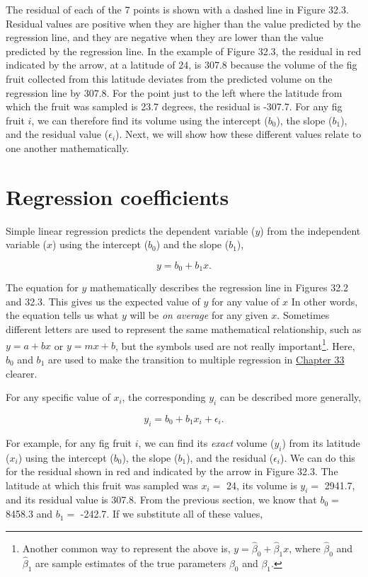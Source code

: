 \documentclass[
  openany]{scrbook}
\begin{document}
The residual of each of the 7 points is shown with a dashed line in Figure 32.3.
Residual values are positive when they are higher than the value predicted by the regression line, and they are negative when they are lower than the value predicted by the regression line.
In the example of Figure 32.3, the residual in red indicated by the arrow, at a latitude of 24, is 307.8 because the volume of the fig fruit collected from this latitude deviates from the predicted volume on the regression line by 307.8.
For the point just to the left where the latitude from which the fruit was sampled is 23.7 degrees, the residual is -307.7.
For any fig fruit \(i\), we can therefore find its volume using the intercept (\(b_{0}\)), the slope (\(b_{1}\)), and the residual value (\(\epsilon_{i}\)).
Next, we will show how these different values relate to one another mathematically.

\hypertarget{regression-coefficients}{%
\section{Regression coefficients}\label{regression-coefficients}}

Simple linear regression predicts the dependent variable (\(y\)) from the independent variable (\(x\)) using the intercept (\(b_{0}\)) and the slope (\(b_{1}\)),

\[y = b_{0} + b_{1}x.\]

The equation for \(y\) mathematically describes the regression line in Figures 32.2 and 32.3.
This gives us the expected value of \(y\) for any value of \(x\)
In other words, the equation tells us what \(y\) will be \emph{on average} for any given \(x\).
Sometimes different letters are used to represent the same mathematical relationship, such as \(y = a + bx\) or \(y = mx + b\), but the symbols used are not really important\footnote{Another common way to represent the above is, \(y = \hat{\beta}_{0} + \hat{\beta}_{1}x\), where \(\hat{\beta}_{0}\) and \(\hat{\beta}_{1}\) are sample estimates of the true parameters \({\beta}_{0}\) and \({\beta}_{1}\).}.
Here, \(b_{0}\) and \(b_{1}\) are used to make the transition to multiple regression in \protect\hyperlink{Chapter_33}{Chapter 33} clearer.

For any specific value of \(x_{i}\), the corresponding \(y_{i}\) can be described more generally,

\[y_{i} = b_{0} + b_{1}x_{i} + \epsilon_{i}.\]

For example, for any fig fruit \(i\), we can find its \emph{exact} volume (\(y_{i}\)) from its latitude (\(x_{i}\)) using the intercept (\(b_{0}\)), the slope (\(b_{1}\)), and the residual (\(\epsilon_{i}\)).
We can do this for the residual shown in red and indicated by the arrow in Figure 32.3.
The latitude at which this fruit was sampled was \(x_{i} =\) 24, its volume is \(y_{i} =\) 2941.7, and its residual value is 307.8.
From the previous section, we know that \(b_{0} =\) 8458.3 and \(b_{1} =\) -242.7.
If we substitute all of these values,
\end{document}
